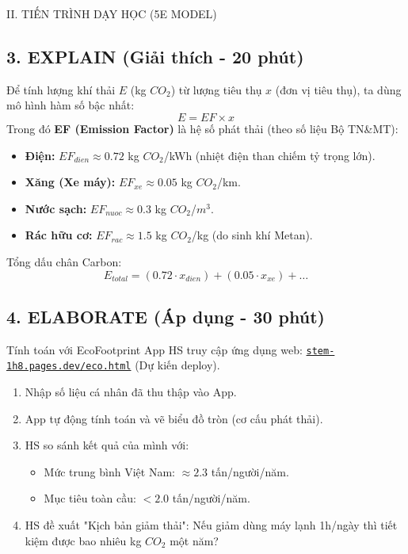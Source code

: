 \documentclass[12pt,a4paper]{article}
\begin{document}
\begin{sectionbox}{II. TIẾN TRÌNH DẠY HỌC (5E MODEL)}
\subsection*{3. EXPLAIN (Giải thích - 20 phút)}
\begin{mathbox}
Để tính lượng khí thải $E$ (kg $CO_2$) từ lượng tiêu thụ $x$ (đơn vị tiêu thụ), ta dùng mô hình hàm số bậc nhất:
$$E = EF \times x$$
Trong đó \textbf{EF (Emission Factor)} là hệ số phát thải (theo số liệu Bộ TN\&MT):
\begin{itemize}
    \item \textbf{Điện:} $EF_{dien} \approx 0.72$ kg $CO_2$/kWh (nhiệt điện than chiếm tỷ trọng lớn).
    \item \textbf{Xăng (Xe máy):} $EF_{xe} \approx 0.05$ kg $CO_2$/km.
    \item \textbf{Nước sạch:} $EF_{nuoc} \approx 0.3$ kg $CO_2$/$m^3$.
    \item \textbf{Rác hữu cơ:} $EF_{rac} \approx 1.5$ kg $CO_2$/kg (do sinh khí Metan).
\end{itemize}
Tổng dấu chân Carbon:
$$E_{total} = (0.72 \cdot x_{dien}) + (0.05 \cdot x_{xe}) + \dots$$
\end{mathbox}

\subsection*{4. ELABORATE (Áp dụng - 30 phút)}
\begin{activitybox}{Tính toán với EcoFootprint App}
HS truy cập ứng dụng web: \href{https://stem-1h8.pages.dev/eco.html}{\texttt{stem-1h8.pages.dev/eco.html}} (Dự kiến deploy).
\begin{enumerate}
    \item Nhập số liệu cá nhân đã thu thập vào App.
    \item App tự động tính toán và vẽ biểu đồ tròn (cơ cấu phát thải).
    \item HS so sánh kết quả của mình với:
    \begin{itemize}
        \item Mức trung bình Việt Nam: $\approx 2.3$ tấn/người/năm.
        \item Mục tiêu toàn cầu: $< 2.0$ tấn/người/năm.
    \end{itemize}
    \item HS đề xuất "Kịch bản giảm thải": Nếu giảm dùng máy lạnh 1h/ngày thì tiết kiệm được bao nhiêu kg $CO_2$ một năm?
\end{enumerate}
\end{activitybox}


\end{sectionbox}
\end{document}
